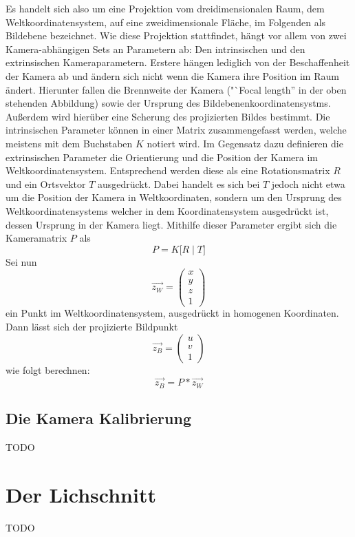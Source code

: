 Es handelt sich also um eine Projektion vom dreidimensionalen Raum, dem Weltkoordinatensystem, auf eine zweidimensionale Fläche, im Folgenden als Bildebene bezeichnet. Wie diese Projektion stattfindet, hängt vor allem von zwei Kamera-abhängigen Sets an Parametern ab: Den intrinsischen und den extrinsischen Kameraparametern. Erstere hängen lediglich von der Beschaffenheit der Kamera ab und ändern sich nicht wenn die Kamera ihre Position im Raum ändert. Hierunter fallen die Brennweite der Kamera ("`Focal length'' in der oben stehenden Abbildung) sowie der Ursprung des Bildebenenkoordinatensystms. Außerdem wird hierüber eine Scherung des projizierten Bildes bestimmt. Die intrinsischen Parameter können in einer Matrix zusammengefasst werden, welche meistens mit dem Buchstaben \(K\) notiert wird.
\newline
Im Gegensatz dazu definieren die extrinsischen Parameter die Orientierung und die Position der Kamera im Weltkoordinatensystem. Entsprechend werden diese als eine Rotationsmatrix \(R\) und ein Ortsvektor \(T\) ausgedrückt. Dabei handelt es sich bei \(T\) jedoch nicht etwa um die Position der Kamera in Weltkoordinaten, sondern um den Ursprung des Weltkoordinatensystems welcher in dem Koordinatensystem ausgedrückt ist, dessen Ursprung in der Kamera liegt.
\newline
Mithilfe dieser Parameter ergibt sich die Kameramatrix \(P\) als
\begin{equation}
	P = K \big[ R \mid T \big] 
\end{equation}
Sei nun 
\begin{equation}
	\vec{z_{W}} = \left(\begin{array}{c}x\\y\\z\\1\end{array}\right)
\end{equation}
ein Punkt im Weltkoordinatensystem, ausgedrückt in homogenen Koordinaten. Dann lässt sich der projizierte Bildpunkt
\begin{equation}
	\vec{z_{B}} = \left(\begin{array}{c}u\\v\\1\end{array}\right)
\end{equation}
wie folgt berechnen:
\begin{equation}
	\vec{z_{B}} = P * \vec{z_{W}}
\end{equation}


\subsection{Die Kamera Kalibrierung}
\label{subsec:KameraKalibrierungTheorie}
TODO

\section{Der Lichschnitt}
TODO